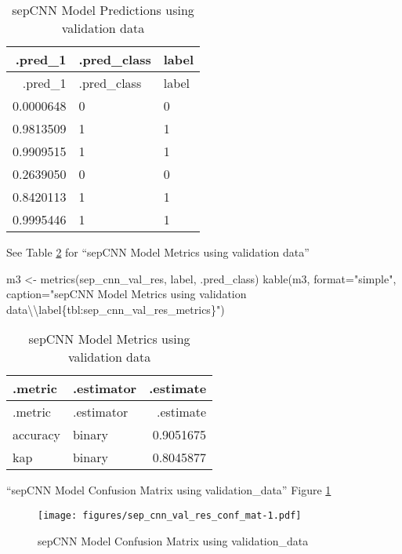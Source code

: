 \documentclass[
]{article}
\newenvironment{Shaded}{}{}
\newcommand{\AttributeTok}[1]{\textcolor[rgb]{0.49,0.56,0.16}{#1}}
\newcommand{\FunctionTok}[1]{\textcolor[rgb]{0.02,0.16,0.49}{#1}}
\newcommand{\NormalTok}[1]{#1}
\newcommand{\OtherTok}[1]{\textcolor[rgb]{0.00,0.44,0.13}{#1}}
\newcommand{\SpecialCharTok}[1]{\textcolor[rgb]{0.25,0.44,0.63}{#1}}
\newcommand{\StringTok}[1]{\textcolor[rgb]{0.25,0.44,0.63}{#1}}
\begin{document}
\begin{longtable}[]{@{}rll@{}}
\caption{sepCNN Model Predictions using validation
data\label{tbl:sep_cnn_val_res}}\tabularnewline
\toprule
.pred\_1 & .pred\_class & label \\
\midrule
\endfirsthead
\toprule
.pred\_1 & .pred\_class & label \\
\midrule
\endhead
0.0000648 & 0 & 0 \\
0.9813509 & 1 & 1 \\
0.9909515 & 1 & 1 \\
0.2639050 & 0 & 0 \\
0.8420113 & 1 & 1 \\
0.9995446 & 1 & 1 \\
\bottomrule
\end{longtable}

See Table \ref{tbl:sep_cnn_val_res_metrics} for ``sepCNN Model Metrics
using validation data''

\begin{Shaded}
\begin{Highlighting}[]
\NormalTok{m3 }\OtherTok{\textless{}{-}} \FunctionTok{metrics}\NormalTok{(sep\_cnn\_val\_res, label, .pred\_class)}
\FunctionTok{kable}\NormalTok{(m3, }\AttributeTok{format=}\StringTok{"simple"}\NormalTok{, }\AttributeTok{caption=}\StringTok{"sepCNN Model Metrics using validation data}\SpecialCharTok{\textbackslash{}\textbackslash{}}\StringTok{label\{tbl:sep\_cnn\_val\_res\_metrics\}"}\NormalTok{)}
\end{Highlighting}
\end{Shaded}

\begin{longtable}[]{@{}llr@{}}
\caption{sepCNN Model Metrics using validation
data\label{tbl:sep_cnn_val_res_metrics}}\tabularnewline
\toprule
.metric & .estimator & .estimate \\
\midrule
\endfirsthead
\toprule
.metric & .estimator & .estimate \\
\midrule
\endhead
accuracy & binary & 0.9051675 \\
kap & binary & 0.8045877 \\
\bottomrule
\end{longtable}

``sepCNN Model Confusion Matrix using validation\_data'' Figure
\ref{fig:model_18}

\begin{figure}
\centering
\texttt{[image: figures/sep\_cnn\_val\_res\_conf\_mat-1.pdf]}
\caption{sepCNN Model Confusion Matrix using
validation\_data\label{fig:model_18}}
\end{figure}
\end{document}
